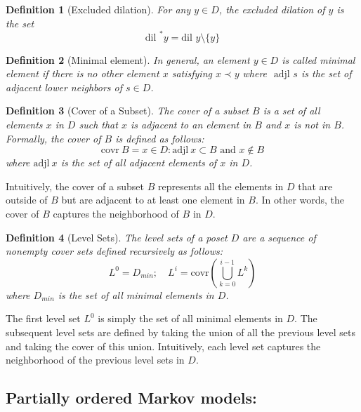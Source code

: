 \documentclass[11pt]{amsart}
\newtheorem{definition}{Definition}
\begin{document}
\begin{definition}[Excluded dilation]
For any $y \in D$, the \textit{excluded dilation}  of $y$ is the set 
\begin{equation}
\text{dil }^* y = \text{dil } y \setminus \{y\}
\end{equation}
\end{definition}

\begin{definition}[Minimal element]
In general, an element $y\in D$ is called \textit{minimal element} if there is no other element $x$ satisfying $x\prec y$ where $\text{ adjl } s$ is the set of adjacent lower neighbors of $s \in D$.
\end{definition}


\begin{definition}[Cover of a Subset]
The cover of a subset $B$ is a set of all elements $x$ in $D$ such that $x$ is adjacent to an element in $B$ and $x$ is not in $B$. Formally, the cover of $B$ is defined as follows:
\begin{equation}
\text{covr}\ B = { x \in D: \text{adjl}\ x \subset B \text{ and } x \notin B } \nonumber
\end{equation}
where $\text{adjl}\ x$ is the set of all adjacent elements of $x$ in $D$.
\end{definition}
Intuitively, the cover of a subset $B$ represents all the elements in $D$ that are outside of $B$ but are adjacent to at least one element in $B$. In other words, the cover of $B$ captures the neighborhood of $B$ in $D$.

\begin{definition}[Level Sets]
The level sets of a poset $D$ are a sequence of nonempty cover sets defined recursively as follows:
\begin{equation}
L^0 = D_{min};\quad L^i = \text{covr}\left( \bigcup_{k=0}^{i-1} L^k \right) \nonumber
\end{equation}
where $D_{min}$ is the set of all minimal elements in $D$.
\end{definition}

The first level set $L^0$ is simply the set of all minimal elements in $D$. The subsequent level sets are defined by taking the union of all the previous level sets and taking the cover of this union. Intuitively, each level set captures the neighborhood of the previous level sets in $D$.



\subsection{Partially ordered Markov models:}
\end{document}

